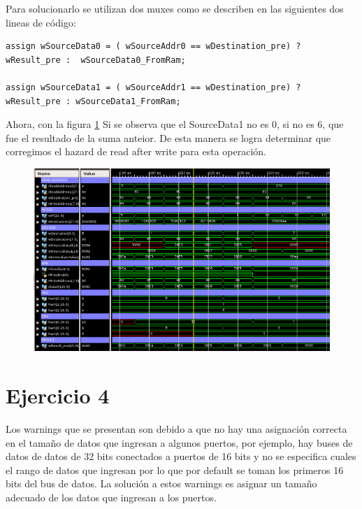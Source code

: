 \documentclass[10pt]{article}
\begin{document}
Para solucionarlo se utilizan dos muxes como se describen en las siguientes dos lineas de código:

\begin{lstlisting}
assign wSourceData0 = ( wSourceAddr0 == wDestination_pre) ?
wResult_pre :  wSourceData0_FromRam;

assign wSourceData1 = ( wSourceAddr1 == wDestination_pre) ?
wResult_pre : wSourceData1_FromRam;
\end{lstlisting}

Ahora, con la figura \ref{raw_bno} Si se observa que el SourceData1 no es 0, si no es 6, que fue el resultado de la suma anteior. De esta manera se logra determinar que corregimos el hazard de read after write para esta operación.

\begin{figure}[hbtp]
\centering
\includegraphics[width=1\textwidth]{read-write-bno.png}
\caption{}
\label{raw_bno}
\end{figure}

\pagebreak 

\section*{Ejercicio 4}
Los warnings que se presentan son debido a que no hay una asignación correcta en el tamaño de datos que ingresan a algunos puertos, por ejemplo, hay buses de datos de datos de 32 bits conectados a puertos de 16 bits y no se especifica cuales el rango de datos que ingresan por lo que por default se toman los primeros 16 bits del bus de datos. 
La solución a estos warnings es asignar un tamaño adecuado de los datos que ingresan a los puertos.
 
\end{document}
